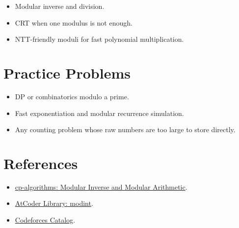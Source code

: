 \begin{itemize}
  \item Modular inverse and division.
  \item CRT when one modulus is not enough.
  \item NTT-friendly moduli for fast polynomial multiplication.
\end{itemize}

\section*{Practice Problems}

\begin{itemize}
  \item DP or combinatorics modulo a prime.
  \item Fast exponentiation and modular recurrence simulation.
  \item Any counting problem whose raw numbers are too large to store directly.
\end{itemize}

\section*{References}

\begin{itemize}
  \item \href{https://cp-algorithms.com/algebra/module-inverse.html}{cp-algorithms: Modular Inverse and Modular Arithmetic}.
  \item \href{https://atcoder.github.io/ac-library/production/document_en/modint.html}{AtCoder Library: modint}.
  \item \href{https://codeforces.com/catalog}{Codeforces Catalog}.
\end{itemize}
